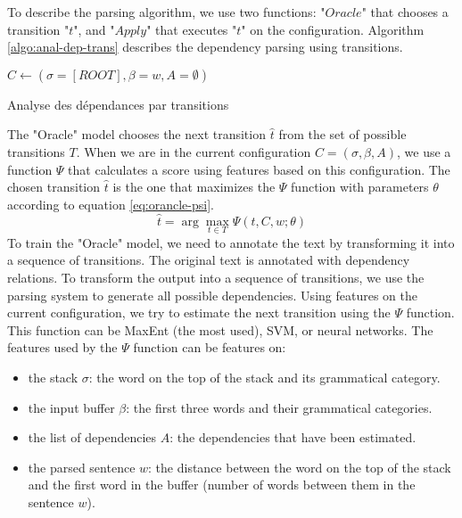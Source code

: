 \documentclass{KodeBook}
\begin{document}
To describe the parsing algorithm, we use two functions: "$Oracle$" that chooses a transition "$t$", and "$Apply$" that executes "$t$" on the configuration. Algorithm \ref{algo:anal-dep-trans} describes the dependency parsing using transitions.

\begin{algorithm}[ht]
	
	$C \leftarrow (\sigma=[ROOT], \beta = w, A = \emptyset)$\;
	
	
	
	\caption{Analyse des dépendances par transitions \label{algo:anal-dep-trans}}
\end{algorithm}

The "Oracle" model chooses the next transition $\hat{t}$ from the set of possible transitions $T$. When we are in the current configuration $C = (\sigma, \beta, A)$, we use a function $\Psi$ that calculates a score using features based on this configuration. The chosen transition $\hat{t}$ is the one that maximizes the $\Psi$ function with parameters $\theta$ according to equation \ref{eq:orancle-psi}.
\begin{equation}\label{eq:orancle-psi}
	\hat{t} = \arg\max\limits_{t \in T} \Psi (t, C, w; \theta)
\end{equation}
To train the "Oracle" model, we need to annotate the text by transforming it into a sequence of transitions. The original text is annotated with dependency relations. To transform the output into a sequence of transitions, we use the parsing system to generate all possible dependencies. Using features on the current configuration, we try to estimate the next transition using the $\Psi$ function. This function can be MaxEnt (the most used), SVM, or neural networks. The features used by the $\Psi$ function can be features on:
\begin{itemize}
	\item the stack $\sigma$: the word on the top of the stack and its grammatical category.
	\item the input buffer $\beta$: the first three words and their grammatical categories.
	\item the list of dependencies $A$: the dependencies that have been estimated.
	\item the parsed sentence $w$: the distance between the word on the top of the stack and the first word in the buffer (number of words between them in the sentence $w$).
\end{itemize}
\end{document}
